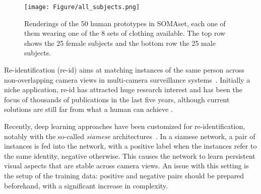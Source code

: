 \documentclass[10pt,journal,letterpaper,compsoc]{IEEEtran}
\begin{document}
\maketitle

\IEEEdisplaynontitleabstractindextext

\IEEEpeerreviewmaketitle






\begin{figure*}[!tb]
    \centering
    \texttt{[image: Figure/all\_subjects.png]}
    \caption{Renderings of the  50  human  prototypes in SOMAset, each one of them wearing one of the 8 sets of clothing available. The top row shows the 25 female subjects and the bottom row the 25  male  subjects.}
    \label{fig:subjects}
\end{figure*}


%

Re-identification (re-id) aims at matching instances of the same person across non-overlapping camera views in multi-camera surveillance systems~\cite{gong2014person}. Initially a niche application, re-id has attracted huge research interest and has been the focus of thousands of publications in the last five years,
although current solutions are still far from what a human can achieve
\cite{cheng2011custom}.


Recently, deep learning approaches have been customized for re-identification, notably with the so-called \emph{siamese} architectures~\cite{li2014deepreid,Ahmed15, mbdml,GATED,LSTM_REID,personnet}. In a siamese network, a pair of instances is fed into the network, with a positive label when  the instances refer to the same identity, negative otherwise. This causes the network to learn persistent visual aspects that are stable across camera views. An issue with this setting is the setup of the training data: positive and negative pairs should be prepared beforehand, with a significant increase in complexity.
\end{document}
